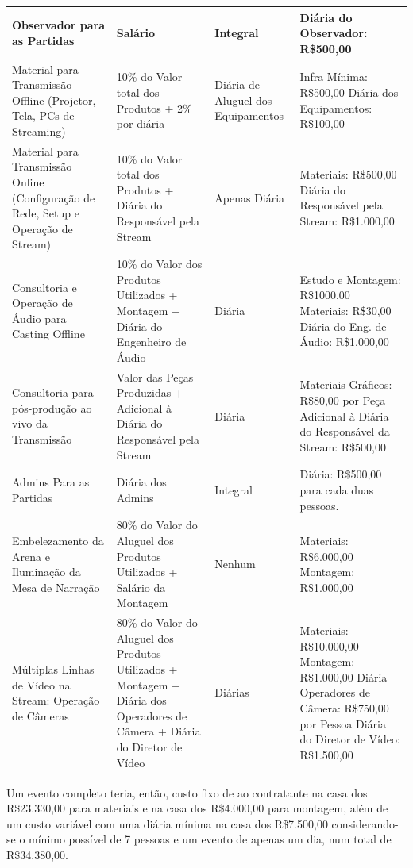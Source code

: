 \documentclass[a4paper, 12pt]{paper}
\begin{document}
\begin{table}[h!]
	\centering
	\begin{tabular}{p{3.5cm}p{3.5cm}p{3.5cm}p{3.5cm}}
	Observador para as Partidas&Salário&Integral&Diária do Observador: R\$500,00\\
	\hline
	Material para Transmissão Offline (Projetor, Tela, PCs de Streaming)&10\% do Valor total dos Produtos + 2\% por diária&Diária de Aluguel dos Equipamentos&Infra Mínima: R\$500,00
	Diária dos Equipamentos: R\$100,00\\
	\hline
	Material para Transmissão Online (Configuração de Rede, Setup e Operação de Stream)&10\% do Valor total dos Produtos + Diária do Responsável pela Stream&Apenas Diária&Materiais: R\$500,00
	Diária do Responsável pela Stream: R\$1.000,00\\
	\hline
	Consultoria e Operação de Áudio para Casting Offline&10\% do Valor dos Produtos Utilizados + Montagem + Diária do Engenheiro de Áudio&Diária&Estudo e Montagem: R\$1000,00
	Materiais: R\$30,00
	Diária do Eng. de Áudio: R\$1.000,00\\
	\hline
	Consultoria para pós-produção ao vivo da Transmissão&Valor das Peças Produzidas + Adicional à Diária do Responsável pela Stream&Diária&Materiais Gráficos: R\$80,00 por Peça
	Adicional à Diária do Responsável da Stream: R\$500,00\\
	\hline
	Admins Para as Partidas&Diária dos Admins&Integral&Diária: R\$500,00 para cada duas pessoas.\\
	\hline
	Embelezamento da Arena e Iluminação da Mesa de Narração&80\% do Valor do Aluguel dos Produtos Utilizados + Salário da Montagem&Nenhum&Materiais: R\$6.000,00
	Montagem: R\$1.000,00\\
	\hline
	Múltiplas Linhas de Vídeo na Stream: Operação de Câmeras&80\% do Valor do Aluguel dos Produtos Utilizados + Montagem + Diária dos Operadores de Câmera + Diária do Diretor de Vídeo&Diárias&Materiais: R\$10.000,00
	Montagem: R\$1.000,00
	Diária Operadores de Câmera: R\$750,00 por Pessoa
	Diária do Diretor de Vídeo: R\$1.500,00\\
	\hline
\end{tabular}
\end{table}
\newpage
Um evento completo teria, então, custo fixo de ao contratante na casa dos R\$23.330,00 para materiais e na casa dos R\$4.000,00 para montagem, além de um custo variável com uma diária mínima na casa dos R\$7.500,00 considerando-se o mínimo possível de 7 pessoas e um evento de apenas um dia, num total de R\$34.380,00.
\end{document}
